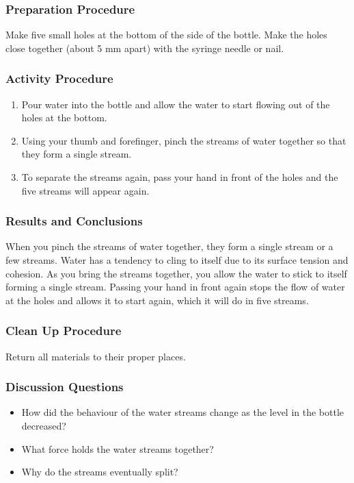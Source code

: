 \subsubsection*{Preparation Procedure}
Make five small holes at the bottom of the side of the bottle. Make the holes close together (about 5 mm apart) with the syringe needle or nail.

\subsubsection*{Activity Procedure}
\begin{enumerate}
\item{Pour water into the bottle and allow the water to start flowing out of the holes at the bottom.}
\item{Using your thumb and forefinger, pinch the streams of water together so that they form a single stream.}
\item{To separate the streams again, pass your hand in front of the holes and the five streams will appear again.}
\end{enumerate}

\subsubsection*{Results and Conclusions}
When you pinch the streams of water together, they form a single stream or a few streams. Water has a tendency to cling to itself due to its surface tension and cohesion. As you bring the streams together, you allow the water to stick to itself forming a single stream. Passing your hand in front again stops the flow of water at the holes and allows it to start again, which it will do in five streams.

\subsubsection*{Clean Up Procedure}
Return all materials to their proper places.

\subsubsection*{Discussion Questions}
\begin{itemize}
\item{How did the behaviour of the water streams change as the level in the bottle decreased?}
\item{What force holds the water streams together?}
\item{Why do the streams eventually split?}
\end{itemize}

